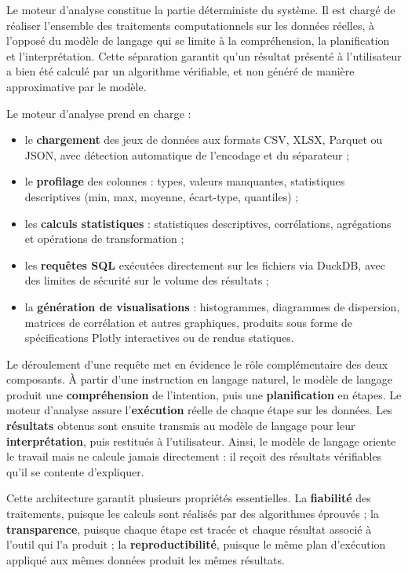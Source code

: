 Le moteur d'analyse constitue la partie déterministe du système. Il est chargé de réaliser l'ensemble des traitements computationnels sur les données réelles, à l'opposé du modèle de langage qui se limite à la compréhension, la planification et l'interprétation. Cette séparation garantit qu'un résultat présenté à l'utilisateur a bien été calculé par un algorithme vérifiable, et non généré de manière approximative par le modèle.

Le moteur d'analyse prend en charge :

\begin{itemize}
  \item le \textbf{chargement} des jeux de données aux formats CSV, XLSX, Parquet ou JSON, avec détection automatique de l'encodage et du séparateur ;
  \item le \textbf{profilage} des colonnes : types, valeurs manquantes, statistiques descriptives (min, max, moyenne, écart-type, quantiles) ;
  \item les \textbf{calculs statistiques} : statistiques descriptives, corrélations, agrégations et opérations de transformation ;
  \item les \textbf{requêtes SQL} exécutées directement sur les fichiers via DuckDB, avec des limites de sécurité sur le volume des résultats ;
  \item la \textbf{génération de visualisations} : histogrammes, diagrammes de dispersion, matrices de corrélation et autres graphiques, produits sous forme de spécifications Plotly interactives ou de rendus statiques.
\end{itemize}

Le déroulement d'une requête met en évidence le rôle complémentaire des deux composants. À partir d'une instruction en langage naturel, le modèle de langage produit une \textbf{compréhension} de l'intention, puis une \textbf{planification} en étapes. Le moteur d'analyse assure l'\textbf{exécution} réelle de chaque étape sur les données. Les \textbf{résultats} obtenus sont ensuite transmis au modèle de langage pour leur \textbf{interprétation}, puis restitués à l'utilisateur. Ainsi, le modèle de langage oriente le travail mais ne calcule jamais directement : il reçoit des résultats vérifiables qu'il se contente d'expliquer.

Cette architecture garantit plusieurs propriétés essentielles. La \textbf{fiabilité} des traitements, puisque les calculs sont réalisés par des algorithmes éprouvés ; la \textbf{transparence}, puisque chaque étape est tracée et chaque résultat associé à l'outil qui l'a produit ; la \textbf{reproductibilité}, puisque le même plan d'exécution appliqué aux mêmes données produit les mêmes résultats.

